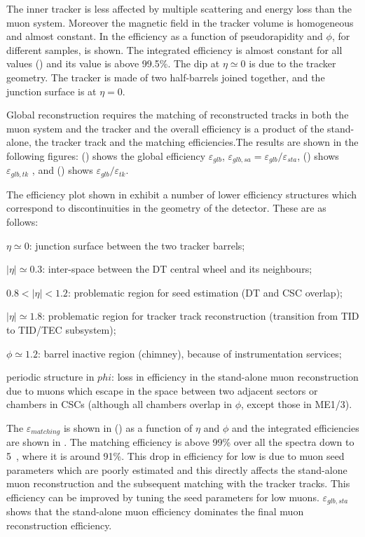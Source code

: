 The inner tracker is less affected by multiple scattering and energy
loss than the muon system. Moreover the magnetic field in the tracker
volume is homogeneous and almost constant. In
 the
efficiency as a function of pseudorapidity and $\phi$, for different
\pt{} samples, is shown. The integrated efficiency is almost constant
for all \pt{} values () and its value is
above 99.5\%.  The dip at $\eta\simeq 0$ is due to the tracker
geometry. The tracker is made of two half-barrels joined together, and
the junction surface is at $\eta = 0$.

Global reconstruction requires the matching of reconstructed tracks in
both the muon system and the tracker and the overall efficiency is a
product of the stand-alone, the tracker track and the matching
efficiencies.The results are shown in the following figures:
() shows the global efficiency
$\varepsilon_{glb}$, $\varepsilon_{glb,sa} =
\varepsilon_{glb}/\varepsilon_{sta}$, ()
shows $\varepsilon_{glb,tk}$ , and ()
shows $\varepsilon_{glb}/\varepsilon_{tk}$.

The efficiency plot shown in  exhibit
a number of lower efficiency structures which correspond to
discontinuities in the geometry of the detector. These
are as follows: \bi
   \item $\eta \simeq 0$: junction surface between the two
     tracker barrels;
   \item $|\eta| \simeq 0.3$: inter-space between the DT central wheel
     and its neighbours;
   \item $0.8<|\eta|<1.2$: problematic region for seed
     estimation (DT and CSC overlap);
   \item $|\eta| \simeq 1.8$: problematic region for tracker track
     reconstruction (transition from TID to TID/TEC subsystem); 
   \item $\phi \simeq 1.2$: barrel inactive region (chimney),
                            because of instrumentation services;
   \item periodic structure in $phi$: loss in efficiency in the
     stand-alone muon reconstruction due to muons which escape in the
     space between two adjacent sectors or chambers in CSCs (although all
     chambers overlap in $\phi$, except those in ME1/3).
     \ei
%

The $\varepsilon_{matching}$ is shown in
() as a function of $\eta$ and
$\phi$ and the integrated efficiencies are shown in .
The matching efficiency is above 99\% over all the \pt{} spectra down to
5~\GeVc, where it is around 91\%. This drop in efficiency for low \pt{}
is due to muon seed parameters which are poorly estimated and this
directly affects the stand-alone muon reconstruction and the subsequent
matching with the tracker tracks.  This efficiency can be improved by
tuning the seed parameters for low \pt{} muons.  $\varepsilon_{glb,sta}$
shows that the stand-alone muon efficiency dominates the final muon
reconstruction efficiency.


